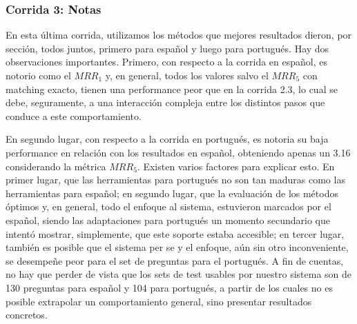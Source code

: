 \begin{frame}
\frametitle{Corrida 3: Notas}

En esta última corrida, utilizamos los métodos que mejores resultados dieron, por sección, todos juntos, primero para español y luego para portugués.
Hay dos observaciones importantes. Primero, con respecto a la corrida en español, es notorio como el $MRR_1$ y, en general, todos los valores salvo el $MRR_5$ con matching exacto, tienen una performance peor que en la corrida 2.3, lo cual se debe, seguramente, a una interacción compleja entre los distintos pasos que conduce a este comportamiento.


En segundo lugar, con respecto a la corrida en portugués, es notoria su baja performance en relación con los resultados en español, obteniendo apenas un 3.16 considerando la métrica $MRR_5$. Existen varios factores para explicar esto. En primer lugar, que las herramientas para portugués no son tan maduras como las herramientas para español; en segundo lugar, que la evaluación de los métodos óptimos y, en general, todo el enfoque al sistema, estuvieron marcados por el español, siendo las adaptaciones para portugués un momento secundario que intentó mostrar, simplemente, que este soporte estaba accesible; en tercer lugar, también es posible que el sistema per se y el enfoque, aún sin otro inconveniente, se desempeñe peor para el set de preguntas para el portugués. A fin de cuentas, no hay que perder de vista que los sets de test usables por nuestro sistema son de 130 preguntas para español y 104 para portugués, a partir de los cuales no es posible extrapolar un comportamiento general, sino presentar resultados concretos.
\end{frame}


